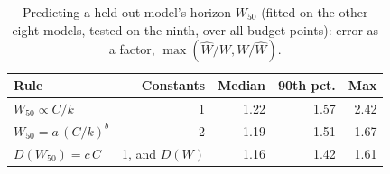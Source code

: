 \begin{table}[t]\centering\footnotesize
\caption{Predicting a held-out model's horizon $W_{50}$ (fitted on the other eight models, tested on the ninth, over all
\rbAaCells{} budget points): error as a factor, $\max(\hat W/W, W/\hat W)$.}\label{tab:lomo}
\begin{tabular}{@{}lrrrr@{}}\toprule
Rule & Constants & Median & 90th pct. & Max \\\midrule
$W_{50}\propto C/k$ & 1 & 1.22 & 1.57 & 2.42 \\
$W_{50}=a\,(C/k)^b$ & 2 & 1.19 & 1.51 & 1.67 \\
$D(W_{50})=c\,C$ & 1, and $D(W)$ & 1.16 & 1.42 & 1.61 \\
\bottomrule\end{tabular}\end{table}
